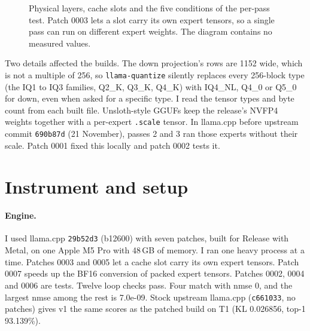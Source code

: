 \documentclass[11pt,a4paper]{article}
\newcommand{\code}[1]{\texttt{#1}}
\begin{document}
\begin{figure}[t]
\caption{Physical layers, cache slots and the five conditions of the per-pass test. Patch 0003 lets a slot carry its own expert tensors, so a single pass can run on different expert weights. The diagram contains no measured values.}
\label{fig:loop}
\end{figure}

Two details affected the builds. The down projection's rows are 1152 wide, which is not a multiple of 256, so \code{llama-quantize} silently replaces every 256-block type (the IQ1 to IQ3 families, Q2\_K, Q3\_K, Q4\_K) with IQ4\_NL, Q4\_0 or Q5\_0 for down, even when asked for a specific type. I read the tensor types and byte count from each built file. Unsloth-style GGUFs keep the release's NVFP4 weights together with a per-expert \code{.scale} tensor. In llama.cpp before upstream commit \code{690b87d} (21 November), passes 2 and 3 ran those experts without their scale. Patch 0001 fixed this locally and patch 0002 tests it.

\section{Instrument and setup}

\paragraph{Engine.} I used llama.cpp \code{29b52d3} (b12600) with seven patches, built for Release with Metal, on one Apple M5 Pro with 48\,GB of memory. I ran one heavy process at a time. Patches 0003 and 0005 let a cache slot carry its own expert tensors. Patch 0007 speeds up the BF16 conversion of packed expert tensors. Patches 0002, 0004 and 0006 are tests. Twelve loop checks pass. Four match with nmse 0, and the largest nmse among the rest is 7.0e-09. Stock upstream llama.cpp (\code{c661033}, no patches) gives v1 the same scores as the patched build on T1 (KL 0.026856, top-1 93.139\%).
\end{document}
